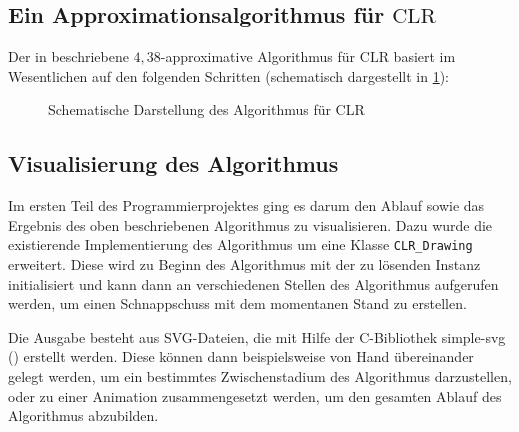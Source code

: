 \documentclass[a4paper,ngerman,11pt,bibtotoc]{scrartcl}
\theoremstyle{definition}
\theoremstyle{plain}
\theoremstyle{remark}
\newcommand{\CLR}{\mathrm{CLR}}
\def\Cpp{{C\nolinebreak[4]\hspace{-.05em}\raisebox{.4ex}{\tiny\bf ++}}}
\begin{document}
	\subsection{Ein Approximationsalgorithmus für $\CLR$}

Der in \cite{AAfCLR} beschriebene $4,38$-approximative Algorithmus für $\CLR$ basiert im Wesentlichen auf den folgenden Schritten (schematisch dargestellt in \cref{fig:CLRAlg}):



\begin{figure}[H]
	\begin{tiny}
		
	\end{tiny}
	\caption{Schematische Darstellung des Algorithmus für CLR}\label{fig:CLRAlg}
\end{figure}

\subsection{Visualisierung des Algorithmus}

Im ersten Teil des Programmierprojektes ging es darum den Ablauf sowie das Ergebnis des oben beschriebenen Algorithmus zu visualisieren. Dazu wurde die existierende Implementierung des Algorithmus um eine Klasse \texttt{CLR\_Drawing} erweitert. Diese wird zu Beginn des Algorithmus mit der zu lösenden Instanz initialisiert und kann dann an verschiedenen Stellen des Algorithmus aufgerufen werden, um einen Schnappschuss mit dem momentanen Stand zu erstellen. 

Die Ausgabe besteht aus SVG-Dateien, die mit Hilfe der \Cpp-Bibliothek simple-svg (\cite{simple-svg}) erstellt werden. Diese können dann beispielsweise von Hand übereinander gelegt werden, um ein bestimmtes Zwischenstadium des Algorithmus darzustellen, oder zu einer Animation zusammengesetzt werden, um den gesamten Ablauf des Algorithmus abzubilden. 
\end{document}
